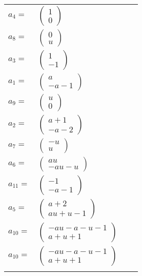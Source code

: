 \documentclass[1p]{elsarticle_modified}
\theoremstyle{definition}
\begin{document}
\begin{tabular}{m{7pt} m{180pt} m{7pt} m{180pt} }
\flushright $a_{4}=$&$\begin{pmatrix}1\\0\end{pmatrix}$ \\
\flushright $a_{8}=$&$\begin{pmatrix}0\\u\end{pmatrix}$ \\
\flushright $a_{3}=$&$\begin{pmatrix}1\\-1\end{pmatrix}$ \\
\flushright $a_{1}=$&$\begin{pmatrix}a\\- a-1\end{pmatrix}$ \\
\flushright $a_{9}=$&$\begin{pmatrix}u\\0\end{pmatrix}$ \\
\flushright $a_{2}=$&$\begin{pmatrix}a+1\\- a-2\end{pmatrix}$ \\
\flushright $a_{7}=$&$\begin{pmatrix}- u\\u\end{pmatrix}$ \\
\flushright $a_{6}=$&$\begin{pmatrix}a u\\- a u- u\end{pmatrix}$ \\
\flushright $a_{11}=$&$\begin{pmatrix}-1\\- a-1\end{pmatrix}$ \\
\flushright $a_{5}=$&$\begin{pmatrix}a+2\\a u+u-1\end{pmatrix}$ \\
\flushright $a_{10}=$&$\begin{pmatrix}- a u- a- u-1\\a+u+1\end{pmatrix}$\\ \flushright $a_{10}=$&$\begin{pmatrix}- a u- a- u-1\\a+u+1\end{pmatrix}$\\&\end{tabular}
\end{document}
